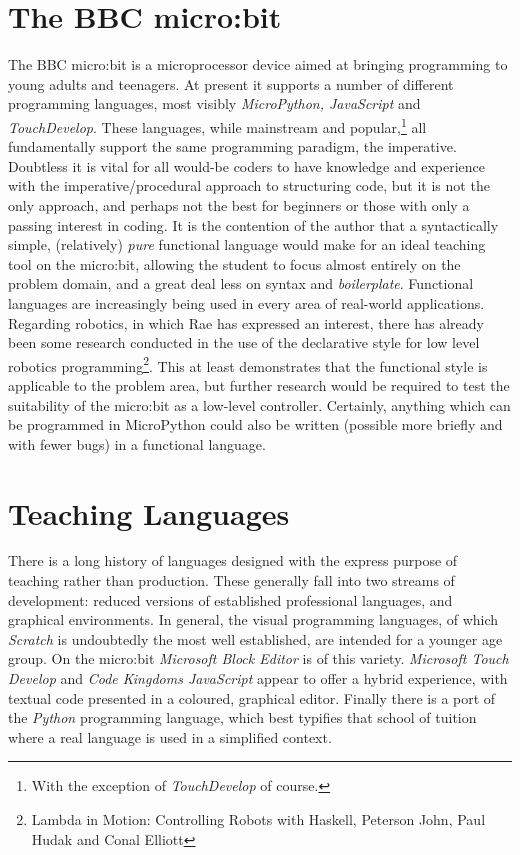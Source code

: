 \documentclass[12pt, a4paper]{report}
\begin{document}
\section{The BBC micro:bit} The BBC micro:bit is a microprocessor device aimed at
bringing programming to young adults and teenagers. At present it supports a number of different
programming languages, most visibly \textit{MicroPython, JavaScript} and \textit{TouchDevelop}.
These languages, while mainstream and popular,\footnote{With the exception of \textit{TouchDevelop}
of course.} all fundamentally support the same programming paradigm, the imperative. Doubtless it
is vital for all would-be coders to have knowledge and experience with the imperative/procedural
approach to structuring code, but it is not the only approach, and perhaps not the best for
beginners or those with only a passing interest in coding. It is the contention of the author that
a syntactically simple, (relatively) \textit{pure} functional language would make for an ideal
teaching tool on the micro:bit, allowing the student to focus almost entirely on the problem domain,
and a great deal less on syntax and \textit{boilerplate}. Functional languages are increasingly
being used in every area of real-world applications. Regarding robotics, in which Rae has expressed
an interest, there has already been some research conducted in the use of the declarative style
for low level robotics programming\footnote{Lambda in Motion: Controlling Robots with Haskell,
Peterson John, Paul Hudak and Conal Elliott}. This at least demonstrates that the functional style
is applicable to the problem area, but further research would be required to test the suitability of
the micro:bit as a low-level controller. Certainly, anything which can be programmed in MicroPython
could also be written (possible more briefly and with fewer bugs) in a functional language.

\section{Teaching Languages}
There is a long history of languages designed with the express purpose of teaching rather than
production. These generally fall into two streams of development: reduced versions of established
professional languages, and graphical environments. In general, the visual programming languages, of
which \textit{Scratch} is undoubtedly the most well established, are intended for a younger age
group. On the micro:bit \textit{Microsoft Block Editor} is of this variety. 
\textit{Microsoft Touch Develop} and \textit{Code Kingdoms JavaScript} appear to offer a hybrid
experience, with textual code presented in a coloured, graphical editor. Finally there is a port of
the \textit{Python} programming language, which best typifies that school of tuition where a real
language is used in a simplified context.
\end{document}
